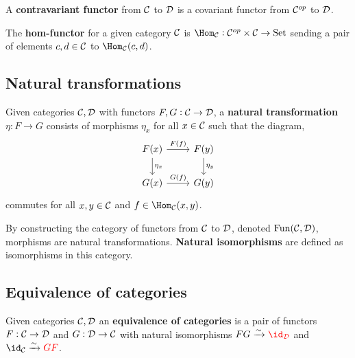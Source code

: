\documentclass[../Year2.tex]{subfiles}
\begin{document}
\begin{definition}
    A \textbf{contravariant functor} from $\mathcal{C}$ to $\mathcal{D}$ is a covariant functor from $\mathcal{C}^{op}$ to $\mathcal{D}$.
\end{definition}

\begin{definition}
    The \textbf{hom-functor} for a given category $\mathcal{C}$ is $\Hom_\CCC:\CCC^{op}\times\CCC\rightarrow\text{Set}$ sending a pair of elements $c,d\in\mathcal{C}$ to $\Hom_\CCC(c,d)$.
\end{definition}

\subsection{Natural transformations}

\begin{definition}
    Given categories $\mathcal{C},\mathcal{D}$ with functors $F,G:\mathcal{C}\rightarrow\mathcal{D}$, a \textbf{natural transformation} $\eta:F\rightarrow G$ consists of morphisms $\eta_x$ for all $x\in\mathcal{C}$ such that the diagram, \[
        \begin{tikzcd}
            F(x)\arrow[r, "F(f)"] \arrow[d, "\eta_x"] & F(y) \arrow[d, "\eta_y"]\\
            G(x)\arrow[r, "G(f)"]  & G(y)
        \end{tikzcd}
    \] commutes for all $x,y\in \mathcal{C}$ and $f\in\Hom_\CCC(x,y)$.
\end{definition}

\begin{remark}
    By constructing the category of functors from $\mathcal{C}$ to $\mathcal{D}$, denoted $\text{Fun}(\mathcal{C},\mathcal{D})$, morphisms are natural transformations. \textbf{Natural isomorphisms} are defined as isomorphisms in this category.
\end{remark}

\subsection{Equivalence of categories}

\begin{definition}[Equivalence]
    Given categories $\mathcal{C},\mathcal{D}$ an \textbf{equivalence of categories} is a pair of functors $F:\mathcal{C}\rightarrow\mathcal{D}$ and $G:\mathcal{D}\rightarrow\mathcal{C}$ with natural isomorphisms $FG\xrightarrow{\sim}\textcolor{red}{\id_\DDD}$ and $\id_\CCC\xrightarrow{\sim}\textcolor{red}{GF}$.
\end{definition}
\end{document}
